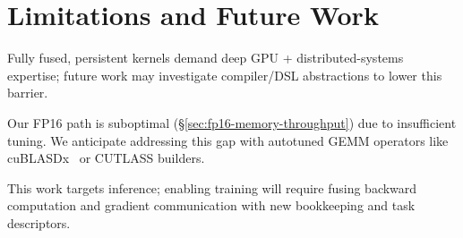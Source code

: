 \section{Limitations and Future Work}\label{sec:limitations}
 Fully fused, persistent kernels demand deep GPU + distributed-systems expertise;
future work may investigate compiler/DSL abstractions to lower this barrier.

 Our FP16 path is suboptimal (\S\ref{sec:fp16-memory-throughput})
due to insufficient tuning.
We anticipate addressing this gap with autotuned GEMM operators like cuBLASDx~\cite{cudx} or
CUTLASS builders.

 This work targets inference;
enabling training will require fusing backward computation and gradient communication with new bookkeeping and
task descriptors.




